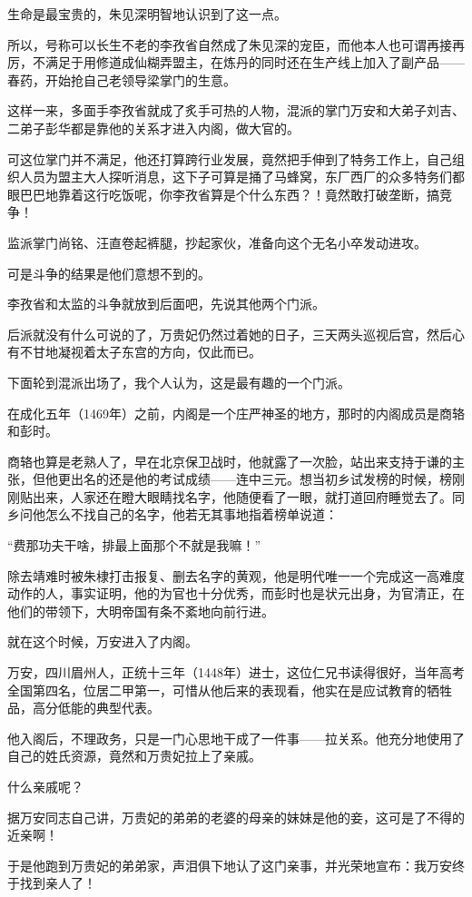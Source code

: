 \begin{multicols}{\theparacolNo}
生命是最宝贵的，朱见深明智地认识到了这一点。

所以，号称可以长生不老的李孜省自然成了朱见深的宠臣，而他本人也可谓再接再厉，不满足于用修道成仙糊弄盟主，在炼丹的同时还在生产线上加入了副产品——春药，开始抢自己老领导梁掌门的生意。

这样一来，多面手李孜省就成了炙手可热的人物，混派的掌门万安和大弟子刘吉、二弟子彭华都是靠他的关系才进入内阁，做大官的。

可这位掌门并不满足，他还打算跨行业发展，竟然把手伸到了特务工作上，自己组织人员为盟主大人探听消息，这下子可算是捅了马蜂窝，东厂西厂的众多特务们都眼巴巴地靠着这行吃饭呢，你李孜省算是个什么东西？！竟然敢打破垄断，搞竞争！

监派掌门尚铭、汪直卷起裤腿，抄起家伙，准备向这个无名小卒发动进攻。

可是斗争的结果是他们意想不到的。

李孜省和太监的斗争就放到后面吧，先说其他两个门派。

后派就没有什么可说的了，万贵妃仍然过着她的日子，三天两头巡视后宫，然后心有不甘地凝视着太子东宫的方向，仅此而已。

下面轮到混派出场了，我个人认为，这是最有趣的一个门派。

在成化五年（1469年）之前，内阁是一个庄严神圣的地方，那时的内阁成员是商辂和彭时。

商辂也算是老熟人了，早在北京保卫战时，他就露了一次脸，站出来支持于谦的主张，但他更出名的还是他的考试成绩——连中三元。想当初乡试发榜的时候，榜刚刚贴出来，人家还在瞪大眼睛找名字，他随便看了一眼，就打道回府睡觉去了。同乡问他怎么不找自己的名字，他若无其事地指着榜单说道：

“费那功夫干啥，排最上面那个不就是我嘛！”

除去靖难时被朱棣打击报复、删去名字的黄观，他是明代唯一一个完成这一高难度动作的人，事实证明，他的为官也十分优秀，而彭时也是状元出身，为官清正，在他们的带领下，大明帝国有条不紊地向前行进。

就在这个时候，万安进入了内阁。

万安，四川眉州人，正统十三年（1448年）进士，这位仁兄书读得很好，当年高考全国第四名，位居二甲第一，可惜从他后来的表现看，他实在是应试教育的牺牲品，高分低能的典型代表。

他入阁后，不理政务，只是一门心思地干成了一件事——拉关系。他充分地使用了自己的姓氏资源，竟然和万贵妃拉上了亲戚。

什么亲戚呢？

据万安同志自己讲，万贵妃的弟弟的老婆的母亲的妹妹是他的妾，这可是了不得的近亲啊！

于是他跑到万贵妃的弟弟家，声泪俱下地认了这门亲事，并光荣地宣布：我万安终于找到亲人了！


\end{multicols}
